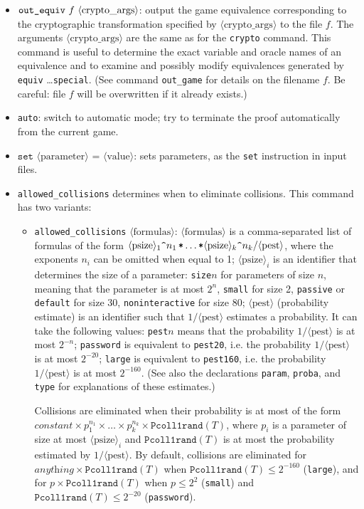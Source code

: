 \documentclass{article}
\newcommand{\tttimes}{\mathop{\texttt{*}}}
\newcommand{\nonterm}[1]{\langle\textrm{#1}\rangle}
\begin{document}
\begin{itemize}
\item $\texttt{out\string_equiv}\ f\ \nonterm{crypto\_args}$: output the
game equivalence corresponding to the cryptographic transformation
specified by $\nonterm{crypto\_args}$ to the file $f$. 
The arguments $\nonterm{crypto\_args}$ are the same as
for the \texttt{crypto} command.
This command is useful to determine the exact variable and oracle
names of an equivalence and to examine and possibly modify equivalences
generated by \texttt{equiv} \dots \texttt{special}.
(See command \texttt{out\string_game} for details on the filename $f$.
Be careful: file $f$ will be overwritten if it already exists.)

\item \texttt{auto}: switch to automatic mode; try to
terminate the proof automatically from the current game.

\item $\texttt{set }\nonterm{parameter}\texttt{ = }\nonterm{value}$:
sets parameters, as the \texttt{set} instruction in input files.

\item \texttt{allowed\string_collisions} determines when to eliminate collisions. This command has two variants:
\begin{itemize}
\item \texttt{allowed\string_collisions} $\nonterm{formulas}$: 
$\nonterm{formulas}$ is 
a comma-separated list of formulas of the form
$\nonterm{psize}_1\texttt{\string^}{n_1} \tttimes \dots \tttimes \nonterm{psize}_k\texttt{\string^}{n_k} / \nonterm{pest}$,
where the exponents $n_i$ can be omitted when equal to 1;
$\nonterm{psize}_i$ is an identifier that determines the size of a
parameter: \texttt{size$n$} for parameters of size $n$, meaning that the parameter is at most $2^n$,
\texttt{small} for size 2, \texttt{passive} or \texttt{default} for size 30,
\texttt{noninteractive} for size 80;
$\nonterm{pest}$ ({\sc p}robability {\sc est}imate) is an identifier 
such that $1/\nonterm{pest}$ estimates a probability. It can take the following values:
\texttt{pest$n$} means that the probability $1/\nonterm{pest}$ is at most $2^{-n}$;
\texttt{password} is equivalent to \texttt{pest20}, i.e. the probability $1/\nonterm{pest}$ is at most $2^{-20}$;
\texttt{large} is equivalent to \texttt{pest160}, i.e. the probability $1/\nonterm{pest}$ is at most $2^{-160}$. (See also the declarations \texttt{param}, \texttt{proba},
and \texttt{type} for explanations of these estimates.)

Collisions are eliminated when their probability 
is at most of the form  $\textit{constant} \times p_1^{n_1} \times \dots \times p_k^{n_k} \times \texttt{Pcoll1rand}(T)$,
where $p_i$ is a parameter of size at most $\nonterm{psize}_i$
and $\texttt{Pcoll1rand}(T)$ is at most the probability estimated by $1/\nonterm{pest}$.
By default, collisions are eliminated for $\textit{anything} \times \texttt{Pcoll1rand}(T)$ when $\texttt{Pcoll1rand}(T) \leq 2^{-160}$ (\texttt{large}),
and for $p \times \texttt{Pcoll1rand}(T)$ when $p \leq 2^2$ (\texttt{small}) and $\texttt{Pcoll1rand}(T) \leq 2^{-20}$ (\texttt{password}).


\end{itemize}
\end{itemize}
\end{document}
